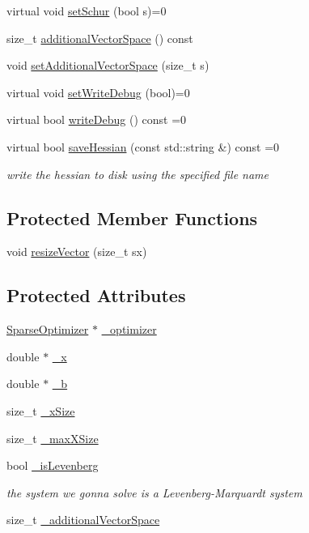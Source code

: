 \begin{DoxyCompactItemize}
virtual void \hyperlink{classg2o_1_1Solver_a30134c828054375b1cc16ede2a879761}{set\+Schur} (bool s)=0
\item 
size\+\_\+t \hyperlink{classg2o_1_1Solver_aeee599d4f7fbeba89c02569174c0c099}{additional\+Vector\+Space} () const 
\item 
void \hyperlink{classg2o_1_1Solver_ad35b33cee11586c8adea12cd6949f74a}{set\+Additional\+Vector\+Space} (size\+\_\+t s)
\item 
virtual void \hyperlink{classg2o_1_1Solver_ad3ef2a487d991363ba86af2840b0d7cd}{set\+Write\+Debug} (bool)=0
\item 
virtual bool \hyperlink{classg2o_1_1Solver_a0f6f14940eccea0f9bf9e2ea144c9b4d}{write\+Debug} () const =0
\item 
virtual bool \hyperlink{classg2o_1_1Solver_a14852543c4dc3f3e7088efe03aa135eb}{save\+Hessian} (const std\+::string \&) const =0
\begin{DoxyCompactList}\small\item\em write the hessian to disk using the specified file name \end{DoxyCompactList}\end{DoxyCompactItemize}
\subsection*{Protected Member Functions}
\begin{DoxyCompactItemize}
\item 
void \hyperlink{classg2o_1_1Solver_ad1f85839e85f3e2c49112fb7e2b843ad}{resize\+Vector} (size\+\_\+t sx)
\end{DoxyCompactItemize}
\subsection*{Protected Attributes}
\begin{DoxyCompactItemize}
\item 
\hyperlink{classg2o_1_1SparseOptimizer}{Sparse\+Optimizer} $\ast$ \hyperlink{classg2o_1_1Solver_aff3275985d996329df15070348c21292}{\+\_\+optimizer}
\item 
double $\ast$ \hyperlink{classg2o_1_1Solver_a94ee5e303a754f4ff338a7b032c214ae}{\+\_\+x}
\item 
double $\ast$ \hyperlink{classg2o_1_1Solver_a52c92c9bf5db0da3322da3a02dbeb245}{\+\_\+b}
\item 
size\+\_\+t \hyperlink{classg2o_1_1Solver_abcf7731347f14915bd9ba963021ea830}{\+\_\+x\+Size}
\item 
size\+\_\+t \hyperlink{classg2o_1_1Solver_a263003f9053537f92d5d019ce5c53771}{\+\_\+max\+X\+Size}
\item 
bool \hyperlink{classg2o_1_1Solver_a8b7f6d4e00e3734f5ed9bd3dfac201a6}{\+\_\+is\+Levenberg}
\begin{DoxyCompactList}\small\item\em the system we gonna solve is a Levenberg-\/\+Marquardt system \end{DoxyCompactList}\item 
size\+\_\+t \hyperlink{classg2o_1_1Solver_a6a1492959487c279747a8f3097a5f04e}{\+\_\+additional\+Vector\+Space}
\end{DoxyCompactItemize}
